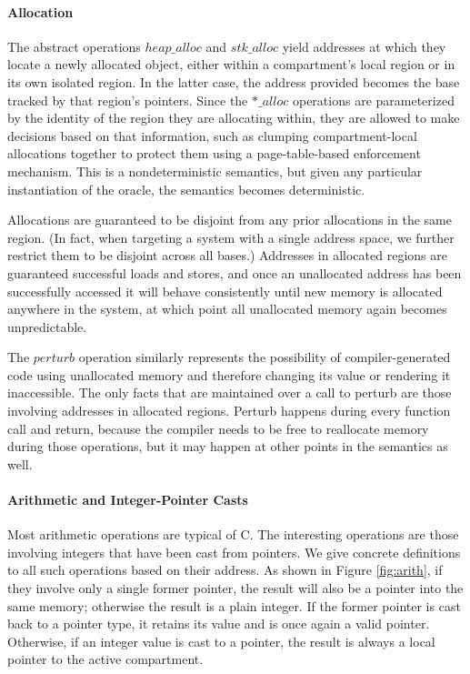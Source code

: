 \documentclass{article}
\begin{document}
\paragraph{Allocation}

The abstract operations \(\mathit{heap\_alloc}\) and \(\mathit{stk\_alloc}\)
yield addresses at which they locate a newly allocated object, either within a
compartment's local region or in its own isolated region. In the latter case,
the address provided becomes the base tracked by that region's pointers.
Since the \(\mathit{*\_alloc}\) operations are parameterized by the identity of
the region they are allocating within, they are allowed to make decisions based on that
information, such as clumping compartment-local allocations together to 
protect them using a page-table-based enforcement mechanism.
This is a nondeterministic semantics, but given any particular instantiation of
the oracle, the semantics becomes deterministic.

Allocations are guaranteed to be disjoint from any prior allocations in the
same region. (In fact, when targeting a system with a single address space, we further restrict
them to be disjoint across all bases.) Addresses in allocated regions are guaranteed
successful loads and stores, and once an unallocated address has been successfully accessed
it will behave consistently until new memory is allocated anywhere in the system,
at which point all unallocated memory again becomes unpredictable.

The \(\mathit{perturb}\) operation similarly represents the possibility of compiler-generated
code using unallocated memory and therefore changing its value or rendering it inaccessible.
The only facts that are maintained over a call to perturb are those involving addresses in
allocated regions. Perturb happens during every function call and return, because the compiler
needs to be free to reallocate memory during those operations, but it may happen at other
points in the semantics as well.

\paragraph{Arithmetic and Integer-Pointer Casts}

Most arithmetic operations are typical of C. The interesting operations are those
involving integers that have been cast from pointers. We give concrete definitions
to all such operations based on their address. As shown in Figure \ref{fig:arith}, if they
involve only a single former pointer, the result will also be a pointer into the
same memory; otherwise the result is a plain integer. If the former pointer is cast
back to a pointer type, it retains its value and is once again a valid pointer.
Otherwise, if an integer value is cast to a pointer, the result is always a local
pointer to the active compartment.
\end{document}
